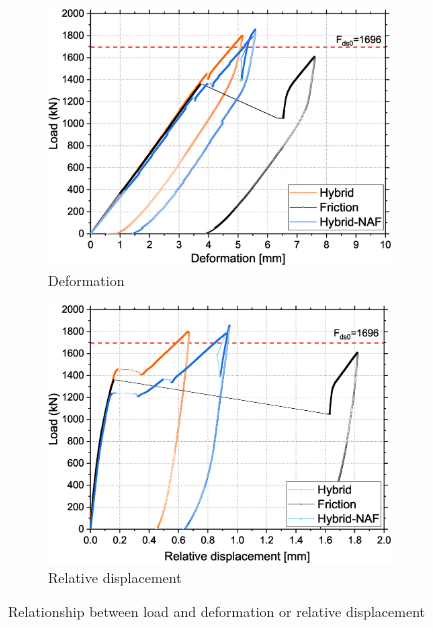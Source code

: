 \begin{figure}
\centering
    \begin{subfigure}[t]{0.45\textwidth}
        \includegraphics[width=\linewidth]{imgs/ch6/load-disp-cor.eps}
        \caption{Deformation}
        \label{fig-loaddisp}
    \end{subfigure}
    \hfill
    \begin{subfigure}[t]{0.45\textwidth}
        \includegraphics[width=\linewidth]{imgs/ch6/RD-bolt10.eps}
        \caption{Relative displacement}
        \label{fig-rd10}
    \end{subfigure}
    \caption{Relationship between load and deformation or relative displacement}
    \label{fig-disp}
\end{figure}


